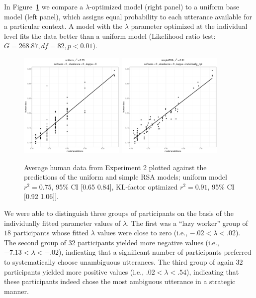 \documentclass[10pt,a4paper]{article}
\newcommand{\gcs}[1]{\textcolor{blue}{[gcs: #1]}}
\begin{document}
In Figure~\ref{kl-factor} we compare a $\lambda$-optimized model (right panel) to a uniform base model (left panel), which assigns equal probability to each utterance available for a particular context.
 A model with the $\lambda$ parameter optimized at the individual level fits the data better than a uniform model  (Likelihood ratio test: $G = 268.87, df = 82, p <0.01$). 
\begin{figure}[ht]
	\centering
	\includegraphics[width=2in]{images/x3_m20.pdf}
	\includegraphics[width=2in]{images/x3_m11.pdf}
	\caption{Average human data from Experiment 2 plotted against the predictions of the uniform and simple RSA models; uniform model  $r^{2}=0.75$, 95\% CI [0.65 0.84], KL-factor optimized  $r^{2}=0.91$, 95\% CI [0.92 1.06]]. }\label{kl-factor}
\end{figure}

We were able to distinguish three groups of participants on the basis of the individually fitted parameter values of $\lambda$. 
The first was a ``lazy worker'' group of $18$ participants whose fitted $\lambda$ values were close to zero (i.e.,  $-.02 < \lambda<.02$).
The second group of $32$ participants yielded more negative values (i.e., $-7.13<\lambda<-.02$), indicating that a significant number of participants preferred to systematically choose unambiguous utterances. 
The third group of again $32$ participants yielded more positive values (i.e., $.02<\lambda<.54$), indicating that these participants indeed chose the most ambiguous utterance in a strategic manner. 
\end{document}
